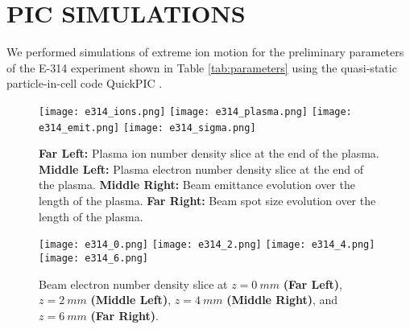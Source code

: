 \documentclass{aac}
\begin{document}
\section{PIC SIMULATIONS}

We performed simulations of extreme ion motion for the preliminary parameters of the E-314 experiment shown in Table \ref{tab:parameters} using the quasi-static particle-in-cell code QuickPIC \cite{quickpic1, quickpic2}.

\begin{figure}[h]
    \centering
    \texttt{[image: e314\_ions.png]}
    \texttt{[image: e314\_plasma.png]}
    \texttt{[image: e314\_emit.png]}
    \texttt{[image: e314\_sigma.png]}
    \centering
    \caption{\textbf{Far Left:} Plasma ion number density  slice at the end of the plasma. \textbf{Middle Left:} Plasma electron number density  slice at the end of the plasma. \textbf{Middle Right:} Beam emittance evolution over the length of the plasma. \textbf{Far Right:} Beam spot size evolution over the length of the plasma.}
    \label{fig:e314other}
\end{figure}

\begin{figure}[h]
    \centering
    \texttt{[image: e314\_0.png]}
    \texttt{[image: e314\_2.png]}
    \texttt{[image: e314\_4.png]}
    \texttt{[image: e314\_6.png]}
    \centering
    \caption{Beam electron number density slice at $z = \SI{0}{mm}$ \textbf{(Far Left)}, $z = \SI{2}{mm}$ \textbf{(Middle Left)}, $z = \SI{4}{mm}$ \textbf{(Middle Right)}, and $z = \SI{6}{mm}$ \textbf{(Far Right)}.}
    \label{fig:e314beam}
\end{figure}
\end{document}
